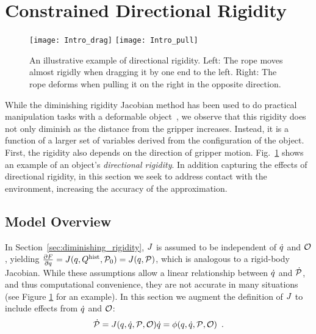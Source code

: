 
\section{Constrained Directional Rigidity}
\label{sec:constrained_model}

\begin{figure}[t]
    \centering
    \texttt{[image: Intro\_drag]}\hfill
    \texttt{[image: Intro\_pull]}%
    \caption{An illustrative example of directional rigidity. Left: The rope moves almost rigidly when dragging it by one end to the left. Right: The rope deforms when pulling it on the right in the opposite direction.}
    \label{fig:intro_directional_rigidity}
\end{figure}

While the diminishing rigidity Jacobian method has been used to do practical manipulation tasks with a deformable object~\cite{Berenson2013}, we observe that this rigidity does not only diminish as the distance from the gripper increases. Instead, it is a function of a larger set of variables derived from the configuration of the object. First, the rigidity also depends on the direction of gripper motion. Fig.~\ref{fig:intro_directional_rigidity} shows an example of an object's \textit{directional rigidity}. In addition capturing the effects of directional rigidity, in this section we seek to address contact with the environment, increasing the accuracy of the approximation.

\subsection{Model Overview}

In Section~\ref{sec:diminishing_rigidity}, $J$ is assumed to be independent of $\dot{q}$ and $\mathcal{O}$, yielding $\frac{\partial F}{\partial q} = J(q, Q^{\textrm{hist}}, \mathcal{P}_0) = J(q, \mathcal{P})$, which is analogous to a rigid-body Jacobian. While these assumptions allow a linear relationship between $\dot{q}$ and $\dot{\mathcal{P}}$, and thus computational convenience, they are not accurate in many situations (see Figure \ref{fig:intro_directional_rigidity} for an example). In this section we augment the definition of $J$ to include effects from $\dot{q}$ and $\mathcal{O}$:
\begin{equation}
    \dot{\mathcal{P}} = J(q, \dot{q}, \mathcal{P}, \mathcal{O}) \dot{q} = \phi(q, \dot{q}, \mathcal{P}, \mathcal{O}) \enspace .
\end{equation}

